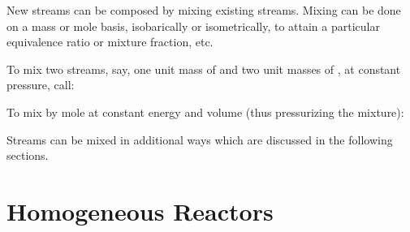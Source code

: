 \documentclass[letterpaper,10pt,english]{sphinxmanual}
\begin{document}
\begin{sphinxVerbatim}[commandchars=\\\{\}]
  
\end{sphinxVerbatim}

New streams can be composed by mixing existing streams.
Mixing can be done on a mass or mole basis, isobarically or isometrically, to attain a particular equivalence ratio or mixture fraction, etc.

To mix two streams, say, one unit mass of  and two unit masses of , at constant pressure, call:

\begin{sphinxVerbatim}[commandchars=\\\{\}]
  \PYG{p}{[}   \PYG{p}{]} 
\end{sphinxVerbatim}

To mix by mole at constant energy and volume (thus pressurizing the mixture):

\begin{sphinxVerbatim}[commandchars=\\\{\}]
  \PYG{p}{[}   \PYG{p}{]}  
\end{sphinxVerbatim}

Streams can be mixed in additional ways which are discussed in the following sections.


\section{Homogeneous Reactors}
\label{\detokenize{combustion:homogeneous-reactors}}
\end{document}
